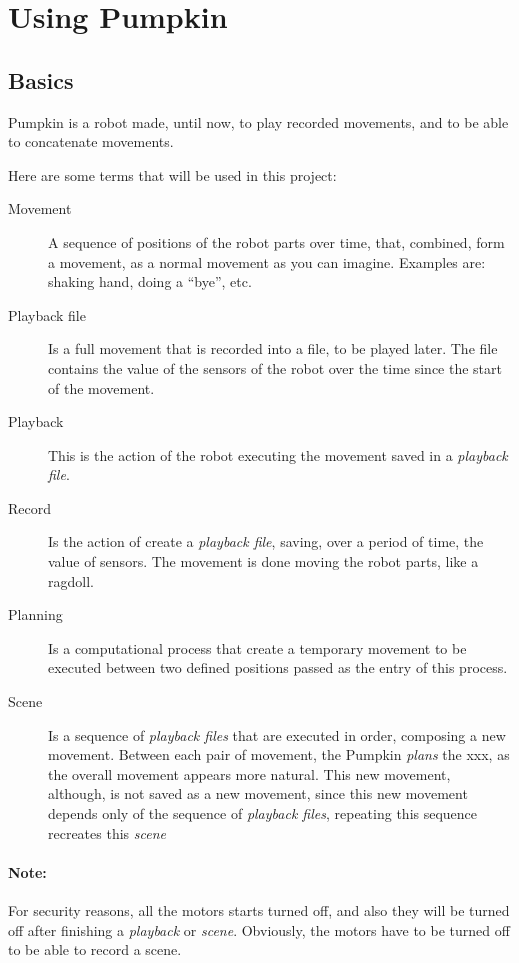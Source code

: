 \documentclass[oneside,a4paper,titlepage]{article}
\begin{document}
\newpage
\section{Using Pumpkin}

\subsection{Basics}

Pumpkin is a robot made, until now, to play recorded movements, and to be able to concatenate movements.

Here are some terms that will be used in this project:

\begin{description}
	\item[Movement] A sequence of positions of the robot parts over time, that, combined, form a movement, as a normal movement as you can imagine. Examples are: shaking hand, doing a ``bye'', etc.
	
	\item[Playback file] Is a full movement that is recorded into a file, to be played later. The file contains the value of the sensors of the robot over the time since the start of the movement.
	
	\item[Playback] This is the action of the robot executing the movement saved in a \emph{playback file}.
	
	\item[Record] Is the action of create a \emph{playback file}, saving, over a period of time, the value of sensors. The movement is done moving the robot parts, like a ragdoll.
	
	\item[Planning] Is a computational process that create a temporary movement to be executed between two defined positions passed as the entry of this process.
	
	\item[Scene] Is a sequence of \emph{playback files} that are executed in order, composing a new movement. Between each pair of movement, the Pumpkin \emph{plans} the xxx, as the overall movement appears more natural. This new movement, although, is not saved as a new movement, since this new movement depends only of the sequence of \emph{playback files}, repeating this sequence recreates this \emph{scene}
\end{description}

\paragraph{Note: } For security reasons, all the motors starts turned off, and also they will be turned off after finishing a \emph{playback} or \emph{scene}. Obviously, the motors have to be turned off to be able to record a scene.
\end{document}
